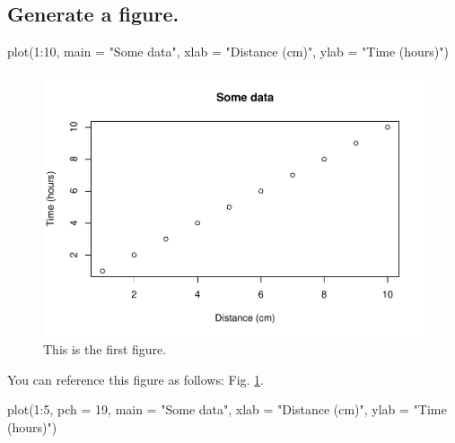 \documentclass[12pt,halfline,a4paper,]{ouparticle}
\newenvironment{Shaded}{\begin{snugshade}}{\end{snugshade}}
\newcommand{\AttributeTok}[1]{\textcolor[rgb]{0.77,0.63,0.00}{#1}}
\newcommand{\DecValTok}[1]{\textcolor[rgb]{0.00,0.00,0.81}{#1}}
\newcommand{\FunctionTok}[1]{\textcolor[rgb]{0.00,0.00,0.00}{#1}}
\newcommand{\NormalTok}[1]{#1}
\newcommand{\SpecialCharTok}[1]{\textcolor[rgb]{0.00,0.00,0.00}{#1}}
\newcommand{\StringTok}[1]{\textcolor[rgb]{0.31,0.60,0.02}{#1}}
\begin{document}
\hypertarget{generate-a-figure.}{%
\subsection{Generate a figure.}\label{generate-a-figure.}}

\begin{Shaded}
\begin{Highlighting}[]
\FunctionTok{plot}\NormalTok{(}\DecValTok{1}\SpecialCharTok{:}\DecValTok{10}\NormalTok{, }\AttributeTok{main =} \StringTok{"Some data"}\NormalTok{, }\AttributeTok{xlab =} \StringTok{"Distance (cm)"}\NormalTok{, }
     \AttributeTok{ylab =} \StringTok{"Time (hours)"}\NormalTok{)}
\end{Highlighting}
\end{Shaded}

\begin{figure}[H]
\includegraphics[width=1\linewidth]{assignment_template_files/figure-latex/fig1-1} \caption{This is the first figure.}\label{fig:fig1}
\end{figure}

You can reference this figure as follows: Fig. \ref{fig:fig1}.

\begin{Shaded}
\begin{Highlighting}[]
\FunctionTok{plot}\NormalTok{(}\DecValTok{1}\SpecialCharTok{:}\DecValTok{5}\NormalTok{, }\AttributeTok{pch =} \DecValTok{19}\NormalTok{, }\AttributeTok{main =} \StringTok{"Some data"}\NormalTok{, }\AttributeTok{xlab =} \StringTok{"Distance (cm)"}\NormalTok{, }
     \AttributeTok{ylab =} \StringTok{"Time (hours)"}\NormalTok{)}
\end{Highlighting}
\end{Shaded}
\end{document}
